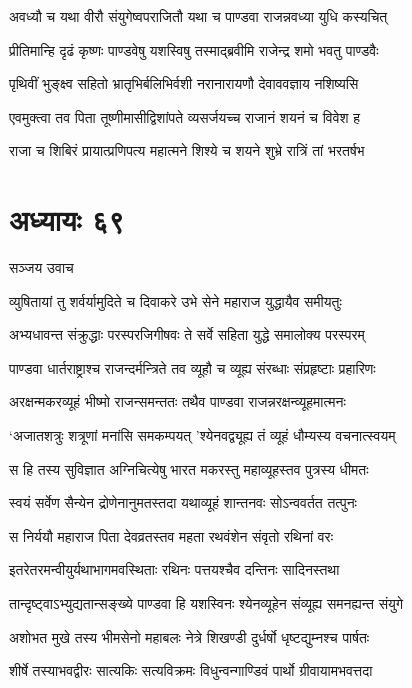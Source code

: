 \twolineshloka
{अवध्यौ च यथा वीरौ संयुगेष्वपराजितौ}
{यथा च पाण्डवा राजन्नवध्या युधि कस्यचित्}


\twolineshloka
{प्रीतिमान्हि दृढं कृष्णः पाण्डवेषु यशस्विषु}
{तस्माद्ब्रवीमि राजेन्द्र शमो भवतु पाण्डवैः}


\twolineshloka
{पृथिवीं भुङ्क्ष्व सहितो भ्रातृभिर्बलिभिर्वशी}
{नरानारायणौ देवाववज्ञाय नशिष्यसि}


\twolineshloka
{एवमुक्त्वा तव पिता तूष्णीमासीद्विशांपते}
{व्यसर्जयच्च राजानं शयनं च विवेश ह}


\twolineshloka
{राजा च शिबिरं प्रायात्प्रणिपत्य महात्मने}
{शिश्ये च शयने शुभ्रे रात्रिं तां भरतर्षभ}


\chapter{अध्यायः ६९}
\twolineshloka
{सञ्जय उवाच}
{}


\twolineshloka
{व्युषितायां तु शर्वर्यामुदिते च दिवाकरे}
{उभे सेने महाराज युद्धायैव समीयतुः}


\twolineshloka
{अभ्यधावन्त संक्रुद्धाः परस्परजिगीषवः}
{ते सर्वे सहिता युद्धे समालोक्य परस्परम्}


\twolineshloka
{पाण्डवा धार्तराष्ट्राश्च राजन्दर्मन्त्रिते तव}
{व्यूहौ च व्यूह्य संरब्धाः संप्रहृष्टाः प्रहारिणः}


\twolineshloka
{अरक्षन्मकरव्यूहं भीष्मो राजन्समन्ततः}
{तथैव पाण्डवा राजन्नरक्षन्व्यूहमात्मनः}


\twolineshloka
{`अजातशत्रुः शत्रूणां मनांसि समकम्पयत्}
{'श्येनवद्व्यूह्य तं व्यूहं धौम्यस्य वचनात्स्वयम्}


\twolineshloka
{स हि तस्य सुविज्ञात अग्निचित्येषु भारत}
{मकरस्तु महाव्यूहस्तव पुत्रस्य धीमतः}


\twolineshloka
{स्वयं सर्वेण सैन्येन द्रोणेनानुमतस्तदा}
{यथाव्यूहं शान्तनवः सोऽन्ववर्तत तत्पुनः}


\twolineshloka
{स निर्ययौ महाराज पिता देवव्रतस्तव}
{महता रथवंशेन संवृतो रथिनां वरः}


\twolineshloka
{इतरेतरमन्वीयुर्यथाभागमवस्थिताः}
{रथिनः पत्तयश्चैव दन्तिनः सादिनस्तथा}


\twolineshloka
{तान्दृष्ट्वाऽभ्युद्यतान्सङ्ख्ये पाण्डवा हि यशस्विनः}
{श्येनव्यूहेन संव्यूह्य समनह्यन्त संयुगे}


\twolineshloka
{अशोभत मुखे तस्य भीमसेनो महाबलः}
{नेत्रे शिखण्डी दुर्धर्षो धृष्टद्युम्नश्च पार्षतः}


\twolineshloka
{शीर्षे तस्याभवद्वीरः सात्यकिः सत्यविक्रमः}
{विधुन्वन्गाण्डिवं पार्थो ग्रीवायामभवत्तदा}


